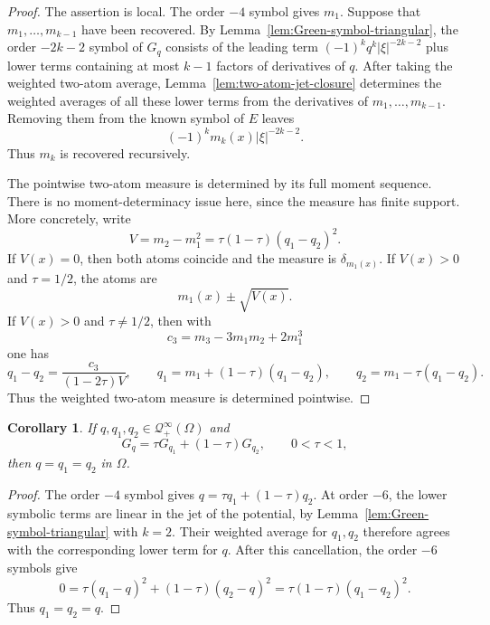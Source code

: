 \documentclass[11pt]{article}
\newcommand{\OmegaD}{\Omega}
\theoremstyle{plain}
\newtheorem{corollary}[theorem]{Corollary}
\theoremstyle{definition}
\theoremstyle{remark}
\begin{document}
\begin{proof}
The assertion is local.  The order $-4$ symbol gives $m_1$.  Suppose that $m_1,\dots,m_{k-1}$ have been recovered.  By Lemma~\ref{lem:Green-symbol-triangular}, the order $-2k-2$ symbol of $G_q$ consists of the leading term $(-1)^kq^k|\xi|^{-2k-2}$ plus lower terms containing at most $k-1$ factors of derivatives of $q$.  After taking the weighted two-atom average, Lemma~\ref{lem:two-atom-jet-closure} determines the weighted averages of all these lower terms from the derivatives of $m_1,\dots,m_{k-1}$.  Removing them from the known symbol of $E$ leaves
\[
  (-1)^k m_k(x)|\xi|^{-2k-2}.
\]
Thus $m_k$ is recovered recursively.

The pointwise two-atom measure is determined by its full moment sequence.  There is no moment-determinacy issue here, since the measure has finite support.  More concretely, write
\[
  V=m_2-m_1^2=\tau(1-\tau)(q_1-q_2)^2.
\]
If $V(x)=0$, then both atoms coincide and the measure is $\delta_{m_1(x)}$.  If $V(x)>0$ and $\tau=1/2$, the atoms are
\[
  m_1(x)\pm \sqrt{V(x)}.
\]
If $V(x)>0$ and $\tau\ne1/2$, then with
\[
  c_3=m_3-3m_1m_2+2m_1^3
\]
one has
\[
  q_1-q_2=\frac{c_3}{(1-2\tau)V},
  \qquad
  q_1=m_1+(1-\tau)(q_1-q_2),
  \qquad
  q_2=m_1-\tau(q_1-q_2).
\]
Thus the weighted two-atom measure is determined pointwise.
\end{proof}

\begin{corollary}\label{cor:Green-rigidity-potential}
If $q,q_1,q_2\in \mathcal Q_+^\infty(\OmegaD)$ and
\[
  G_q=\tau G_{q_1}+(1-\tau)G_{q_2},
  \qquad 0<\tau<1,
\]
then $q=q_1=q_2$ in $\OmegaD$.
\end{corollary}

\begin{proof}
The order $-4$ symbol gives $q=\tau q_1+(1-\tau)q_2$.  At order $-6$, the lower symbolic terms are linear in the jet of the potential, by Lemma~\ref{lem:Green-symbol-triangular} with $k=2$.  Their weighted average for $q_1,q_2$ therefore agrees with the corresponding lower term for $q$.  After this cancellation, the order $-6$ symbols give
\[
  0=\tau(q_1-q)^2+(1-\tau)(q_2-q)^2
  =\tau(1-\tau)(q_1-q_2)^2.
\]
Thus $q_1=q_2=q$.
\end{proof}
\end{document}
